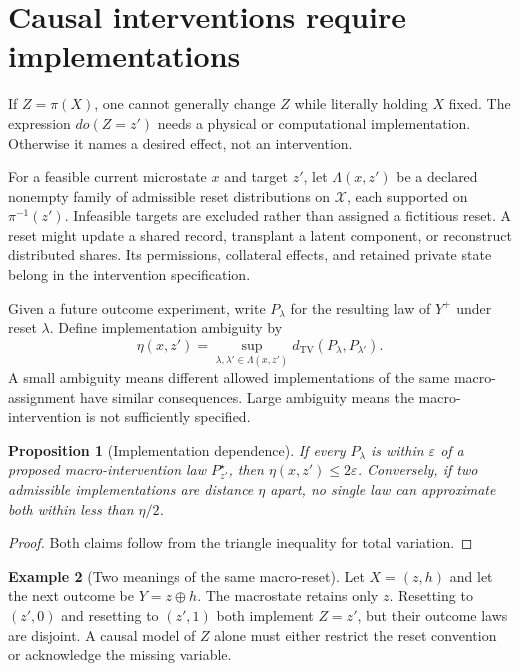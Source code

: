 \documentclass[11pt,letterpaper]{article}
\theoremstyle{plain}
\newtheorem{proposition}{Proposition}[section]
\theoremstyle{definition}
\newtheorem{example}[proposition]{Example}
\theoremstyle{remark}
\newcommand{\TV}{d_{\mathrm{TV}}}
\newcommand{\X}{\mathcal X}
\begin{document}
\section{Causal interventions require implementations}\label{sec:causal}
If $Z=\pi(X)$, one cannot generally change $Z$ while literally holding $X$ fixed. The expression $do(Z=z')$ needs a physical or computational implementation. Otherwise it names a desired effect, not an intervention.

For a feasible current microstate $x$ and target $z'$, let $\Lambda(x,z')$ be a declared nonempty family of admissible reset distributions on $\X$, each supported on $\pi^{-1}(z')$. Infeasible targets are excluded rather than assigned a fictitious reset. A reset might update a shared record, transplant a latent component, or reconstruct distributed shares. Its permissions, collateral effects, and retained private state belong in the intervention specification.

Given a future outcome experiment, write $P_\lambda$ for the resulting law of $Y^+$ under reset $\lambda$. Define implementation ambiguity by
\[
\eta(x,z')=\sup_{\lambda,\lambda'\in\Lambda(x,z')}
\TV(P_\lambda,P_{\lambda'}).
\]
A small ambiguity means different allowed implementations of the same macro-assignment have similar consequences. Large ambiguity means the macro-intervention is not sufficiently specified.

\begin{proposition}[Implementation dependence]\label{prop:lift}
If every $P_\lambda$ is within $\varepsilon$ of a proposed macro-intervention law $P^\star_{z'}$, then $\eta(x,z')\leq2\varepsilon$. Conversely, if two admissible implementations are distance $\eta$ apart, no single law can approximate both within less than $\eta/2$.
\end{proposition}
\begin{proof}
Both claims follow from the triangle inequality for total variation.
\end{proof}

\begin{example}[Two meanings of the same macro-reset]
Let $X=(z,h)$ and let the next outcome be $Y=z\oplus h$. The macrostate retains only $z$. Resetting to $(z',0)$ and resetting to $(z',1)$ both implement $Z=z'$, but their outcome laws are disjoint. A causal model of $Z$ alone must either restrict the reset convention or acknowledge the missing variable.
\end{example}
\end{document}
